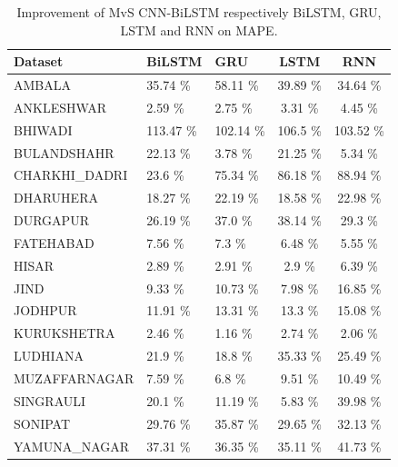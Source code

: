 \documentclass[a4paper, fleqn]{cas-sc}
\theoremstyle{definition}
\theoremstyle{remark}
\begin{document}
  \begin{table}[]
    \caption{Improvement of MvS CNN-BiLSTM respectively BiLSTM,  GRU,  LSTM and RNN on MAPE.}
    \label{MAPE imp}
    \begin{tabular}{lllcc}
    \hline   Dataset       &   BiLSTM &   GRU &   LSTM &   RNN  \\ \hline
      AMBALA        &35.74           \% &58.11        \% &39.89         \% &34.64 \%       \\
      ANKLESHWAR      &2.59            \% &2.75         \% &3.31          \% &4.45 \%          \\
      BHIWADI        &113.47          \% &102.14       \% &106.5         \% &103.52 \%        \\
      BULANDSHAHR   &22.13           \% &3.78         \% &21.25         \% &5.34   \%        \\
      CHARKHI\_DADRI  &23.6            \% &75.34        \% &86.18         \% &88.94 \%         \\
      DHARUHERA      &18.27           \% &22.19        \% &18.58         \% &22.98 \%         \\
      DURGAPUR       &26.19           \% &37.0         \% &38.14         \% &29.3 \%          \\
      FATEHABAD       &7.56            \% &7.3          \% &6.48          \% &5.55 \%           \\
      HISAR           &2.89            \% &2.91         \% &2.9           \% &6.39 \%          \\
      JIND            &9.33            \% &10.73        \% &7.98          \% &16.85 \%         \\
      JODHPUR         &11.91           \% &13.31        \% &13.3          \% &15.08 \%          \\
      KURUKSHETRA     &2.46            \% &1.16         \% &2.74          \% &2.06 \%          \\
      LUDHIANA        &21.9            \% &18.8         \% &35.33         \% &25.49 \%         \\
      MUZAFFARNAGAR   &7.59            \% &6.8          \% &9.51          \% &10.49 \%          \\
      SINGRAULI      &20.1            \% &11.19        \% &5.83          \% &39.98 \%         \\
      SONIPAT        &29.76           \% &35.87        \% &29.65         \% &32.13 \%         \\
      YAMUNA\_NAGAR   &37.31           \% &36.35        \% &35.11         \% &41.73 \%         \\ \hline
    \end{tabular}
    \end{table}
\end{document}
